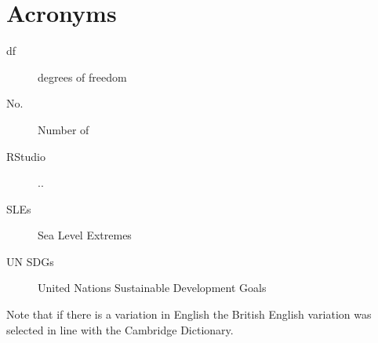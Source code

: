 
\chapter{Acronyms}
\begin{description}
\item[df]degrees of freedom
\item[No.] Number of
\item [RStudio] ..
\item[SLEs] Sea Level Extremes
\item [UN SDGs] United Nations Sustainable Development Goals 
\end{description}

Note that if there is a variation in English the British English variation was selected in line with the Cambridge Dictionary. 